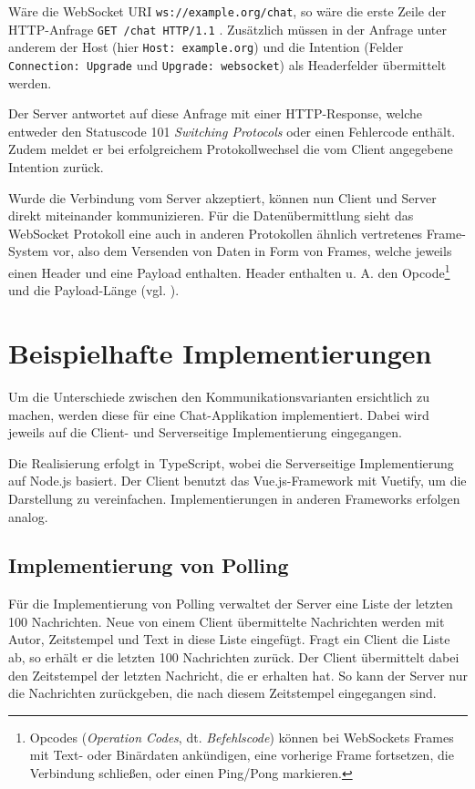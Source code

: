 \documentclass[sigplan, screen]{acmart}
\begin{document}
Wäre die WebSocket URI \texttt{ws://example.org/chat}, so wäre die erste Zeile der HTTP-Anfrage \texttt{GET /chat HTTP/1.1} \cite[Abs. 4.1]{melnikov_websocket_2011}.
Zusätzlich müssen in der Anfrage unter anderem der Host (hier \texttt{Host: example.org}) und die Intention (Felder \texttt{Connection: Upgrade} und \texttt{Upgrade: websocket}) als Headerfelder übermittelt werden.

Der Server antwortet auf diese Anfrage mit einer HTTP-Response, welche entweder den Statuscode 101 \emph{Switching Protocols} oder einen Fehlercode enthält.
Zudem meldet er bei erfolgreichem Protokollwechsel die vom Client angegebene Intention zurück.

Wurde die Verbindung vom Server akzeptiert, können nun Client und Server direkt miteinander kommunizieren.
Für die Datenübermittlung sieht das WebSocket Protokoll eine auch in anderen Protokollen ähnlich vertretenes Frame-System vor,
also dem Versenden von Daten in Form von Frames, welche jeweils einen Header und eine Payload enthalten.
Header enthalten u. A. den Opcode\footnote{Opcodes (\emph{Operation Codes}, dt. \emph{Befehlscode}) können bei WebSockets Frames mit Text- oder Binärdaten ankündigen, eine vorherige Frame fortsetzen, die Verbindung schließen, oder einen Ping/Pong markieren.} und die Payload-Länge (vgl. \cite[Abs. 5.2]{melnikov_websocket_2011}).


\section{Beispielhafte Implementierungen}

Um die Unterschiede zwischen den Kommunikationsvarianten ersichtlich zu machen, werden diese für eine Chat-Applikation implementiert.
Dabei wird jeweils auf die Client- und Serverseitige Implementierung eingegangen.

Die Realisierung erfolgt in TypeScript, wobei die Serverseitige Implementierung auf Node.js basiert.
Der Client benutzt das Vue.js-Framework mit Vuetify, um die Darstellung zu vereinfachen.
Implementierungen in anderen Frameworks erfolgen analog.


\subsection{Implementierung von Polling}

Für die Implementierung von Polling verwaltet der Server eine Liste der letzten 100 Nachrichten.
Neue von einem Client übermittelte Nachrichten werden mit Autor, Zeitstempel und Text in diese Liste eingefügt.
Fragt ein Client die Liste ab, so erhält er die letzten 100 Nachrichten zurück.
Der Client übermittelt dabei den Zeitstempel der letzten Nachricht, die er erhalten hat.
So kann der Server nur die Nachrichten zurückgeben, die nach diesem Zeitstempel eingegangen sind.
\end{document}
